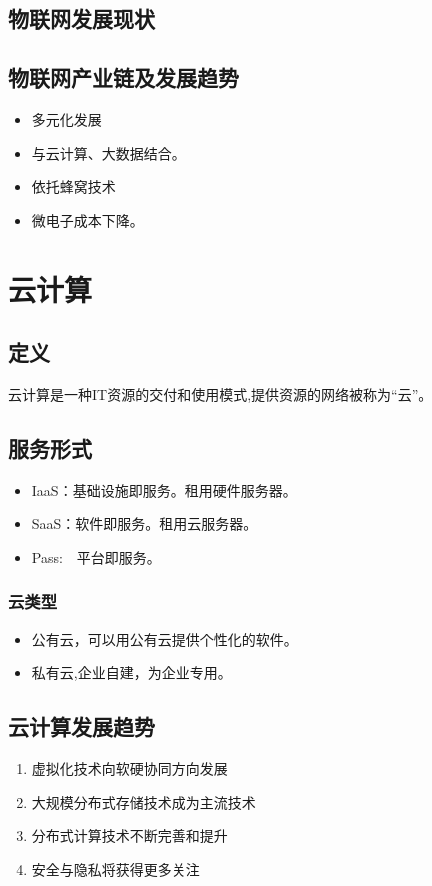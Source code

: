 \documentclass{report}
\begin{document}
	\section{物联网发展现状}
	\section{物联网产业链及发展趋势}
	\begin{itemize}
		\item 多元化发展
		\item 与云计算、大数据结合。
		\item 依托蜂窝技术
		\item 微电子成本下降。
	\end{itemize}
	\chapter{云计算}
	\section{定义}
	云计算是一种IT资源的交付和使用模式,提供资源的网络被称为“云”。
	\section{服务形式}
	\begin{itemize}
		\item IaaS：基础设施即服务。租用硬件服务器。
		\item SaaS：软件即服务。租用云服务器。
		\item Pass:　平台即服务。
	\end{itemize}
	\subsection{云类型}
	\begin{itemize}
		\item 公有云，可以用公有云提供个性化的软件。
		\item 私有云,企业自建，为企业专用。
	\end{itemize}
	\section{云计算发展趋势}
	\begin{enumerate}
		\item 虚拟化技术向软硬协同方向发展
		\item  大规模分布式存储技术成为主流技术
		\item  分布式计算技术不断完善和提升
		\item 安全与隐私将获得更多关注
	\end{enumerate}
\end{document}

